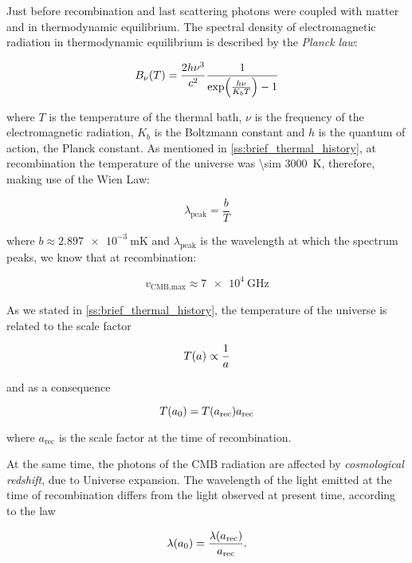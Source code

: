 Just before recombination and last scattering photons were
coupled with matter and in thermodynamic equilibrium. The spectral density
of electromagnetic radiation in thermodynamic equilibrium is described by
the \emph{Planck law}:

\begin{equation}
        B_\nu\qty(T) = \frac{2h\nu^3}{c^2}
        \frac{1}{\exp(\frac{h\nu}{K_b T}) - 1}
\end{equation}

where $T$ is the temperature of the thermal bath, $\nu$ is the frequency of
the electromagnetic radiation, $K_b$ is the Boltzmann constant and $h$ is
the quantum of action, the Planck constant. As mentioned in
\autoref{ss:brief_thermal_history}, at recombination the temperature of the
universe was \SI{\sim 3000}{\kelvin}, therefore, making use of the Wien
Law:

\begin{equation}
        \lambda_{\text{peak}} = \frac{b}{T}
\end{equation}

where $b \approx \SI{2.897e-3}{\meter\kelvin}$ and
$\lambda_{\text{peak}}$ is the wavelength at which the spectrum
peaks, we know that at recombination:

\begin{equation}
        v_{\text{CMB,max}} \approx \SI{7e4}{\giga\hertz}
\end{equation}

As we stated in \autoref{ss:brief_thermal_history}, the temperature of the
universe is related to the scale factor

\begin{equation}
        T\qty(a) \propto \frac{1}{a}
\end{equation}

and as a consequence

\begin{equation}
        T\qty(a_0) = T\qty(a_{\text{rec}}) a_{\text{rec}}
        \label{eq:t_scale}
\end{equation}

where $a_{\text{rec}}$ is the scale factor at the time of recombination.

At the same time, the photons of the CMB radiation are affected by \emph{cosmological
redshift}, due to Universe expansion. The wavelength of the light emitted
at the time of recombination differs from the light observed at present
time, according to the law

\begin{equation}
        \lambda\qty(a_0) = \frac{\lambda\qty(a_{\text{rec}})}{a_{\text{rec}}}.
\end{equation}

